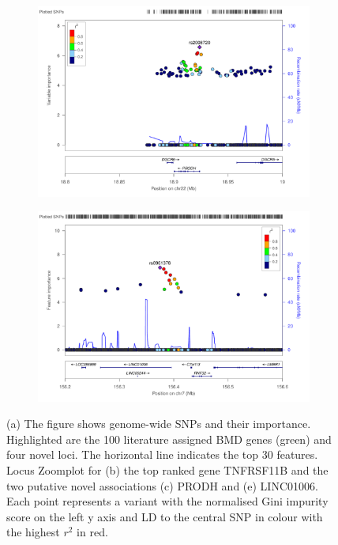 \documentclass[10pt,letterpaper]{article}
\begin{document}
\begin{figure}[tbhp]
\begin{adjustwidth}{-2.00in}{0in}
\begin{subfigure}[b]{0.5\linewidth}
     \includegraphics[totalheight=7cm]{./figs/new_10k_PRODH.pdf}
      \label{zoomplotprodh} 
    \end{subfigure} 
        \begin{subfigure}[b]{0.5\linewidth}
     \includegraphics[totalheight=7cm]{./figs/EUR_chr7_156_2-156_6mb.pdf}
      \label{zoomplotlinc} 
    \end{subfigure} 
    \begin{flushleft}
      (a) The figure shows genome-wide SNPs and their importance. Highlighted are the 100 literature assigned BMD genes (green) and four novel loci. The horizontal line indicates the top 30 features. 
      Locus Zoomplot for (b) the top ranked gene TNFRSF11B and the two putative novel associations (c) PRODH and (e) LINC01006. Each point represents a variant with the normalised Gini impurity score on the left y axis and LD to the central SNP in colour with the highest $r^2$ in red.
     \end{flushleft}
  \end{adjustwidth}
        \label{manhattenzoom} 
\end{figure}
\end{document}
